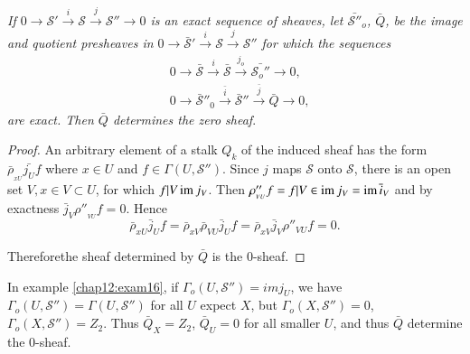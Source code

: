 \textit{If $0 \to \mathscr{S'} \xrightarrow{i} \mathscr{S}
  \xrightarrow{j} \mathscr{S}'' \to 0$ is an exact sequence of
    sheaves, let $\bar{\mathscr{S}''}_o$, $\bar{Q}$, be the
    image and quotient presheaves in $0 \to \bar{\mathscr{S}}'
  \xrightarrow{i} \mathscr{S} \xrightarrow{j} \mathscr{S}''$
  for which the sequences} 
\begin{align*}
&0 \to \bar{\mathscr{S}} \xrightarrow{i} \bar{\mathscr{S}}
  \xrightarrow{j_o}        \bar{\mathscr{S}_o''} \to 0,\\ 
&0 \to \bar{\mathscr{S}}''_0 \xrightarrow{\bar{i}} \bar{\mathscr{S}}''
  \xrightarrow{\bar{j}} \bar{Q} \to 0,
\end{align*}
\textit{are exact. Then  $\bar{Q}$ determines the zero sheaf}.

\begin{proof}
An arbitrary element of a stalk $Q_k$ of the induced sheaf has the
form $\bar{\rho}_{_{xU}} \bar{j_U}f$ where $x \in  U$ and $f \in \Gamma
(U, \mathscr{S}'')$. Since $j$  maps $\mathscr{S}$ onto $\mathscr{S}$,
there is an open set $V, x \in  V \subset U$, for which $f| V \operatorname{im}
j_V$. Then  $\rho''_{_{VU}} f =f|V \in \operatorname{im}  j_V= \operatorname{im} \bar{i}_V$ and by
exactness $\bar{j}_V \rho''_{_{VU}}  f = 0$. Hence 
$$
\bar{\rho}_{xU} \bar{j}_U f= \bar{\rho}_{xV}\bar{\rho}_{VU} \bar{j}_U 
f= \bar{\rho}_{xV} \bar{j}_V \rho''_{VU} f=0. 
$$

Therefore\pageoriginale the sheaf determined by $\bar{Q}$ is the 0-sheaf.
\end{proof}

\begin{note*}
In example \ref{chap12:exam16}, if $\Gamma_o(U, \mathscr{S}'')= im j_U$, we have
$\Gamma_o(U, \mathscr{S}'')=\Gamma(U, \mathscr{S}'')$ for all $U$
expect $X$, but $\Gamma_o(X, \mathscr{S}'')=0$, $\Gamma_o(X,
\mathscr{S}'')= Z_2$. Thus  $\bar{Q}_X= Z_2$, $\bar{Q}_U=0$ for all
smaller $U$, and thus $\bar{Q}$ determine the 0-sheaf. 
\end{note*}

